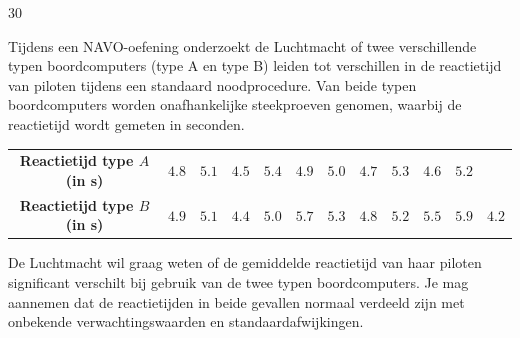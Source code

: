 \begin{question}{30}{
    Tijdens een NAVO-oefening onderzoekt de Luchtmacht of twee verschillende typen boordcomputers (type A en type B) leiden tot verschillen in de reactietijd van piloten tijdens een standaard noodprocedure.
    Van beide typen boordcomputers worden onafhankelijke steekproeven genomen, waarbij de reactietijd wordt gemeten in seconden.
    \begin{center}
        \begin{tabular}{c|ccccccccccc}
            \toprule
                \textbf{Reactietijd type $A$ (in s)} & $4.8$ & $5.1$ & $4.5$ & $5.4$ & $4.9$ & $5.0$ & $4.7$ & $5.3$ & $4.6$ & $5.2$ & \\
                \textbf{Reactietijd type $B$ (in s)} & $4.9$ & $5.1$ & $4.4$ & $5.0$ & $5.7$ & $5.3$ & $4.8$ & $5.2$ & $5.5$ & $5.9$ & $4.2$ \\
            \bottomrule
        \end{tabular}
    \end{center}
    De Luchtmacht wil graag weten of de gemiddelde reactietijd van haar piloten significant verschilt bij gebruik van de twee typen boordcomputers.
    Je mag aannemen dat de reactietijden in beide gevallen normaal verdeeld zijn met onbekende verwachtingswaarden en standaardafwijkingen.
}   
    

\end{question}
